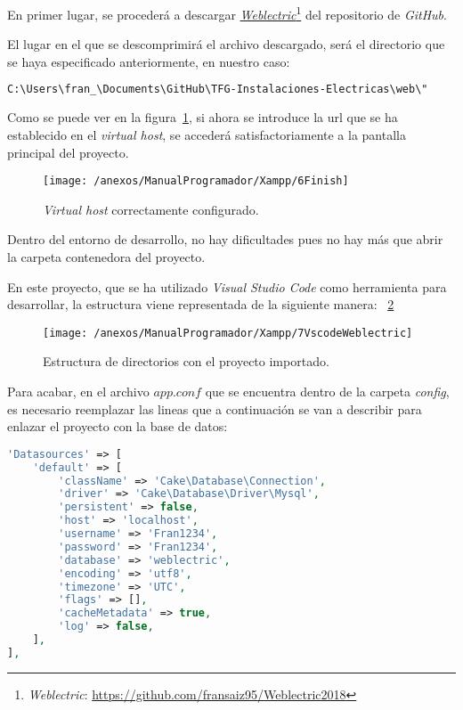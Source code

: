 En primer lugar, se procederá a descargar \href{https://github.com/fransaiz95/Weblectric2018}{\textit{Weblectric}}\footnote{\textit{Weblectric}: \url{https://github.com/fransaiz95/Weblectric2018}} del repositorio de \textit{GitHub}.

El lugar en el que se descomprimirá el archivo descargado, será el directorio que se haya especificado anteriormente, en nuestro caso:
\begin{lstlisting}[language=bash]
C:\Users\fran_\Documents\GitHub\TFG-Instalaciones-Electricas\web\"
\end{lstlisting}

Como se puede ver en la figura~\ref{img:XAMPP_Finish}, si ahora se introduce la url que se ha establecido en el \textit{virtual host}, se accederá satisfactoriamente a la pantalla principal del proyecto.

\begin{figure}[h]
	\centering
	\texttt{[image: /anexos/ManualProgramador/Xampp/6Finish]}
	\caption{\textit{Virtual host} correctamente configurado.}
	\label{img:XAMPP_Finish}
\end{figure}

Dentro del entorno de desarrollo, no hay dificultades pues no hay más que abrir la carpeta contenedora del proyecto.

En este proyecto, que se ha utilizado \textit{Visual Studio Code} como herramienta para desarrollar, la estructura viene representada de la siguiente manera: ~\ref{img:VsCodeWeblectric}

\begin{figure}[h]
	\centering
	\texttt{[image: /anexos/ManualProgramador/Xampp/7VscodeWeblectric]}
	\caption{Estructura de directorios con el proyecto importado.}
	\label{img:VsCodeWeblectric}
\end{figure}

\newpage

Para acabar, en el archivo $app.conf$ que se encuentra dentro de la carpeta \textit{config}, es necesario reemplazar las lineas que a continuación se van a describir para enlazar el proyecto con la base de datos:

\begin{lstlisting}[language=php]
'Datasources' => [
	'default' => [
		'className' => 'Cake\Database\Connection',
		'driver' => 'Cake\Database\Driver\Mysql',
		'persistent' => false,
		'host' => 'localhost',
		'username' => 'Fran1234',
		'password' => 'Fran1234',
		'database' => 'weblectric',
		'encoding' => 'utf8',
		'timezone' => 'UTC',
		'flags' => [],
		'cacheMetadata' => true,
		'log' => false,
	],
],
\end{lstlisting}

